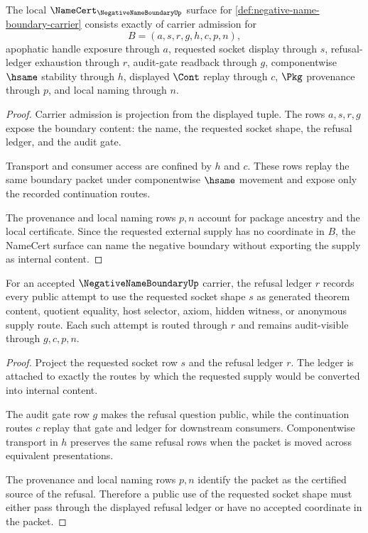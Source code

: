 \begin{theorem}
\label{thm:negative-name-boundary-namecert-obligations}
The local $\NameCert_{\NegativeNameBoundaryUp}$ surface for \autoref{def:negative-name-boundary-carrier} consists exactly of carrier admission for
$$
B=(a,s,r,g,h,c,p,n),
$$
apophatic handle exposure through $a$, requested socket display through $s$, refusal-ledger exhaustion through $r$, audit-gate readback through $g$, componentwise $\hsame$ stability through $h$, displayed $\Cont$ replay through $c$, $\Pkg$ provenance through $p$, and local naming through $n$.
\end{theorem}
\begin{proof}
Carrier admission is projection from the displayed tuple. The rows $a,s,r,g$ expose the boundary content: the name, the requested socket shape, the refusal ledger, and the audit gate.

Transport and consumer access are confined by $h$ and $c$. These rows replay the same boundary packet under componentwise $\hsame$ movement and expose only the recorded continuation routes.

The provenance and local naming rows $p,n$ account for package ancestry and the local certificate. Since the requested external supply has no coordinate in $B$, the NameCert surface can name the negative boundary without exporting the supply as internal content.
\end{proof}

\begin{theorem}
\label{thm:negative-name-boundary-refusal-ledger}
For an accepted $\NegativeNameBoundaryUp$ carrier, the refusal ledger $r$ records every public attempt to use the requested socket shape $s$ as generated theorem content, quotient equality, host selector, axiom, hidden witness, or anonymous supply route. Each such attempt is routed through $r$ and remains audit-visible through $g,c,p,n$.
\end{theorem}
\begin{proof}
Project the requested socket row $s$ and the refusal ledger $r$. The ledger is attached to exactly the routes by which the requested supply would be converted into internal content.

The audit gate row $g$ makes the refusal question public, while the continuation routes $c$ replay that gate and ledger for downstream consumers. Componentwise transport in $h$ preserves the same refusal rows when the packet is moved across equivalent presentations.

The provenance and local naming rows $p,n$ identify the packet as the certified source of the refusal. Therefore a public use of the requested socket shape must either pass through the displayed refusal ledger or have no accepted coordinate in the packet.
\end{proof}

